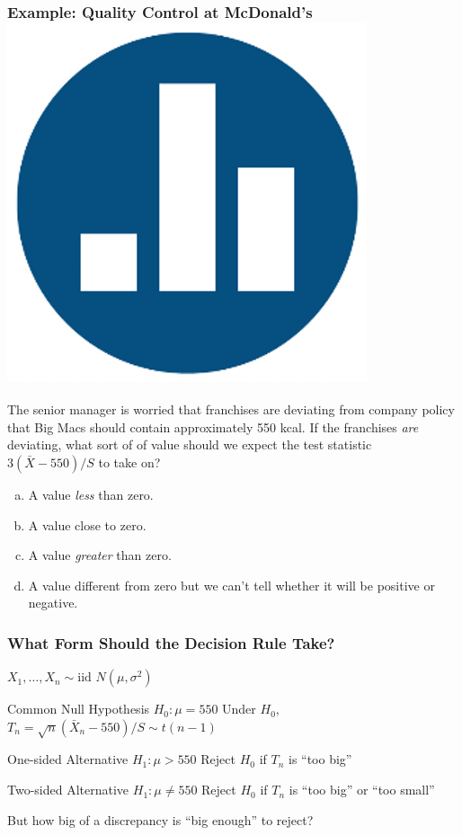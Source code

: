 \begin{frame}
\frametitle{Example: Quality Control at McDonald's \hfill \includegraphics[scale = 0.05]{./images/clicker}}
The senior manager is worried that franchises are deviating from company policy that Big Macs should contain approximately 550 kcal. \alert{If the franchises \emph{are} deviating, what sort of of value should we expect the test statistic $3(\bar{X} - 550)/S$ to take on?}

\vspace{1em}
\begin{enumerate}[(a)]
	\item A value \emph{less} than zero.
	\item A value close to zero.
	\item A value \emph{greater} than zero.
	\item A value different from zero but we can't tell whether it will be positive or negative.
\end{enumerate}
\end{frame}
\begin{frame}
\frametitle{What Form Should the Decision Rule Take?}
$X_1, \hdots, X_n \sim \mbox{iid } N(\mu, \sigma^2)$ 
\begin{block}{Common Null Hypothesis $H_0\colon \mu = 550$}
Under $H_0$, $T_n = \sqrt{n}(\bar{X}_n - 550)/S \sim t(n-1)$ 
\end{block}
\begin{block}{One-sided Alternative $H_1\colon \mu > 550$}
Reject $H_0$ if $T_n$ is ``too big'' 
\end{block}
\begin{block}{Two-sided Alternative $H_1\colon \mu \neq 550$} 
Reject $H_0$ if $T_n$ is ``too big'' or ``too small''
\end{block}

\vspace{1em}

\alert{But how big of a discrepancy is ``big enough'' to reject?}
\end{frame}

